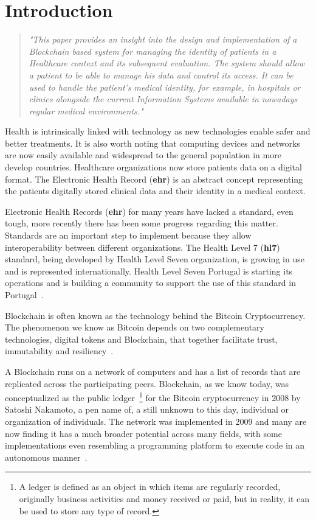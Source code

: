 \chapter{Introduction}\label{introduction}

\begin{quote} \emph{"This paper provides an insight into the design and
  implementation of a Blockchain based system for managing the identity of
  patients in a Healthcare context and its subsequent evaluation. The system
  should allow a patient to be able to manage his data and control its access.
It can be used to handle the patient’s medical identity, for example, in
hospitals or clinics  alongside the current Information Systems available in
nowadays regular medical environments."} \end{quote}

Health is intrinsically linked with technology as new technologies enable safer
and better treatments. It is also worth noting that computing devices and
networks are now easily available and widespread to the general population in
more develop countries. Healthcare organizations now store patients data on a
digital format. The Electronic Health Record (\textbf{ehr}) is an abstract
concept representing the patients digitally stored clinical data and their
identity in a medical context.

Electronic Health Records (\textbf{ehr}) for many years have lacked a standard,
even tough, more recently there has been some progress regarding this matter.
Standards are an important step to implement because they allow
interoperability between different organizations. The Health Level 7
(\textbf{hl7}) standard, being developed by Health Level Seven organization, is
growing in use and is represented internationally. Health Level Seven Portugal
is starting its operations and is building a community to support the use of
this standard in Portugal~\cite{HealthLevel7}.

Blockchain is often known as the technology behind the Bitcoin Cryptocurrency.
The phenomenon we know as Bitcoin depends on two complementary technologies,
digital tokens and Blockchain, that together facilitate trust, immutability and
resiliency~\cite{Evans2016}.

A Blockchain runs on a network of computers and has a list of records that are
replicated across the participating peers. Blockchain, as we know today, was
conceptualized as the public ledger~\footnote{A ledger is defined as an object in
which items are regularly recorded, originally business activities and money
received or paid, but in reality, it can be used to store any type of record.} for the Bitcoin cryptocurrency in 2008 by Satoshi Nakamoto,
a pen name of, a still unknown to this day, individual or organization of
individuals. The network was implemented in 2009 and many are now finding it
has a much broader potential across many fields, with some implementations even
resembling a programming platform to execute code in an autonomous
manner~\cite{Nakamoto2008}.

